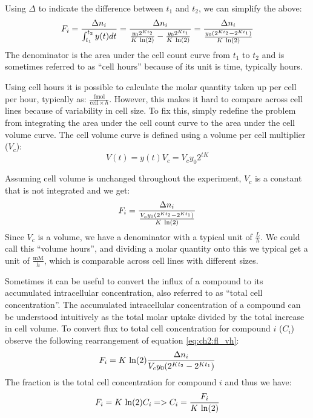 Using $\Delta$ to indicate the difference between $t_1$ and $t_2$, we can simplify the above:
\begin{equation}
    F_i = \frac{\Delta n_i}{\int_{t_1}^{t_2} y(t) dt} = \frac{\Delta n_i}{\frac{y_0 2^{K t_2}}{K\ \natlog(2)} - \frac{y_0 2^{K t_1}}{K\ \natlog(2)}} = \frac{\Delta n_i}{\frac{y_0 (2^{K t_2} - 2^{K t_1})}{K\ \natlog(2)}}
\end{equation}
The denominator is the area under the cell count curve from $t_1$ to $t_2$ and is sometimes referred to as ``cell hours'' because of its unit is time, typically hours.

Using cell hours it is possible to calculate the molar quantity taken up per cell per hour, typically as: $\frac{\text{fmol}}{\text{cell}\times h}$.
However, this makes it hard to compare across cell lines because of variability in cell size.
To fix this, simply redefine the problem from integrating the area under the cell count curve to the area under the cell volume curve.
The cell volume curve is defined using a volume per cell multiplier ($V_c$):
\begin{equation}
    V(t) = y(t) V_c = V_c y_0 2^{t K}
\end{equation}

Assuming cell volume is unchanged throughout the experiment, $V_c$ is a constant that is not integrated and we get:
\begin{equation}
    F_i = \frac{\Delta n_i}{\frac{V_c y_0 (2^{K t_2} - 2^{K t_1})}{K\ \text{ln}(2)}}
\label{eq:ch2:fl_vh}
\end{equation}
Since $V_c$ is a volume, we have a denominator with a typical unit of $\frac{L}{h}$.
We could call this ``volume hours'', and dividing a molar quantity onto this we typical get a unit of $\frac{\text{mM}}{h}$, which is comparable across cell lines with different sizes.

Sometimes it can be useful to convert the influx of a compound to its accumulated intracellular concentration, also referred to as ``total cell concentration''.
The accumulated intracellular concentration of a compound can be understood intuitively as the total molar uptake divided by the total increase in cell volume.
To convert flux to total cell concentration for compound $i$ ($C_i$) observe the following rearrangement of equation \ref{eq:ch2:fl_vh}:
\begin{equation}
    F_i = K\ \text{ln}(2) \frac{\Delta n_i}{V_c y_0 (2^{K t_2} - 2^{K t_1})}
\end{equation}
The fraction is the total cell concentration for compound $i$ and thus we have:
\begin{equation}
    F_i = K\ \text{ln}(2) C_i => C_i = \frac{F_i}{K\ \text{ln}(2)}
\label{eq:ch2:CtoF}
\end{equation}


